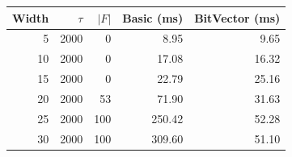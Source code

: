 \begin{tabular}{rrrrr}
\toprule
Width & $\tau$ & $|F|$ & Basic (ms) & BitVector (ms) \\
\midrule
5 & 2000 & 0 & 8.95 & 9.65 \\
10 & 2000 & 0 & 17.08 & 16.32 \\
15 & 2000 & 0 & 22.79 & 25.16 \\
20 & 2000 & 53 & 71.90 & 31.63 \\
25 & 2000 & 100 & 250.42 & 52.28 \\
30 & 2000 & 100 & 309.60 & 51.10 \\
\bottomrule
\end{tabular}
